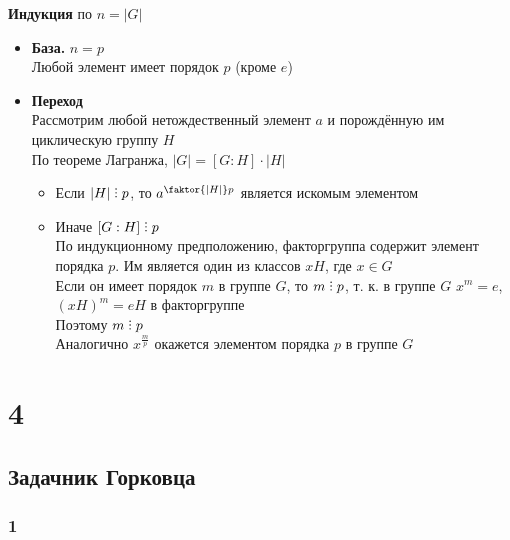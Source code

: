\textbf{Индукция} по $ n = |G| $
\begin{itemize}
    \item \textbf{База.} $ n = p $ \\
    Любой элемент имеет порядок $ p $ (кроме $ e $)
    \item \textbf{Переход} \\
    Рассмотрим любой нетождественный элемент $ a $ и порождённую им циклическую группу $ H $ \\
    По теореме Лагранжа, $ |G| = [G:H] \cdot |H| $
    \begin{itemize}
        \item Если $ |H| \divby p $, то $ a^{\faktor{|H|}p} $ является искомым элементом
        \item Иначе $ [G:H] \divby p $ \\
        По индукционному предположению, факторгруппа содержит элемент порядка $ p $. Им является один из классов $ xH $, где $ x \in G $ \\
        Если он имеет порядок $ m $ в группе $ G $, то $ m \divby p $, т. к. в группе $ G $ $ x^m = e $,  $(xH)^m = eH $ в факторгруппе \\
        Поэтому $ m \divby p $ \\
        Аналогично $ x^{\frac{m}p} $ окажется элементом порядка $ p $ в группе $ G $
    \end{itemize}

\end{itemize}

\chapter{4}

\section{Задачник Горковца}

\subsection{1}

